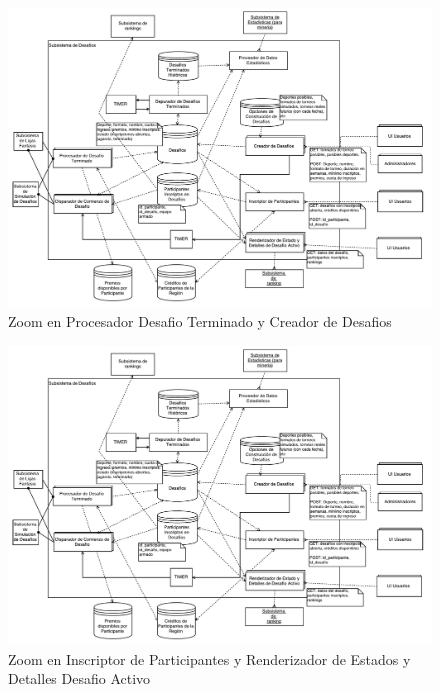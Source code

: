 \begin{figure}[H]
  \includegraphics[width=\textwidth, page=3, clip, trim=20 0 20 30]{imagenes/Subs-desafios.pdf}
  \caption{Zoom en Procesador Desafio Terminado y Creador de Desafios}
\end{figure}

\begin{figure}[H]
  \includegraphics[width=\textwidth, page=4, clip, trim=20 0 20 0]{imagenes/Subs-desafios.pdf}
  \caption{Zoom en Inscriptor de Participantes y Renderizador de Estados y Detalles Desafio Activo}
\end{figure}
